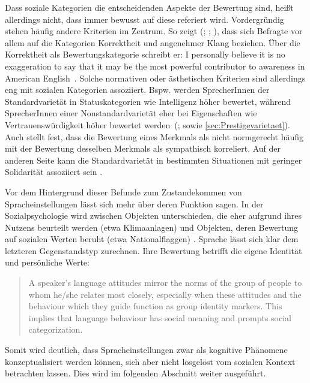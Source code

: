Dass soziale Kategorien die entscheidenden Aspekte der Bewertung sind, heißt allerdings nicht, dass immer bewusst auf diese referiert wird. 
Vordergründig stehen häufig andere Kriterien im Zentrum. 
So zeigt \citeauthor{Preston2004} (\citeyear{Preston1996}; \citeyear{Preston2004}; \citeyear{Preston2005}), dass sich Befragte vor allem auf die Kategorien Korrektheit und angenehmer Klang beziehen. 
Über die Korrektheit als Bewertungskategorie schreibt er: {\glqq}I personally believe it is no exaggeration to say that it may be the most powerful contributor to awareness in American English{\grqq}~\citep[54]{Preston1996}. 
Solche normativen oder ästhetischen Kriterien sind allerdings eng mit sozialen Kategorien assoziiert. 
Bspw. werden SprecherInnen der Standardvariet{\"a}t in Statuskategorien wie Intelligenz h{\"o}her bewertet, w{\"a}hrend SprecherInnen einer Nonstandardvariet{\"a}t eher bei Eigenschaften wie Vertrauensw{\"u}rdigkeit h{\"o}her bewertet werden~(\citealp[s.][155]{Creber.1983}; sowie \autoref{sec:Prestigevarietaet}). 
Auch \citet[732]{Neuland.1993} stellt fest, dass die Bewertung eines Merkmals als nicht normgerecht h{\"a}ufig mit der Bewertung desselben Merkmals als sympathisch korreliert. 
Auf der anderen Seite kann die Standardvarietät in bestimmten Situationen mit geringer Solidarität assoziiert sein \citep[s.][586--587]{Giles.1988}.

Vor dem Hintergrund dieser Befunde zum Zustandekommen von Spracheinstellungen lässt sich mehr über deren Funktion sagen. 
In der Sozialpsychologie wird zwischen Objekten unterschieden, die eher aufgrund ihres Nutzens beurteilt werden (etwa Klimaanlagen) und Objekten, deren Bewertung auf sozialen Werten beruht (etwa Nationalflaggen) \citep[s.][210]{Jonas.2014}. 
Sprache lässt sich klar dem letzteren Gegenstandstyp zurechnen. 
Ihre Bewertung betrifft die eigene Identität und persönliche Werte: 
\begin{quote} A speaker's language attitudes mirror the norms of the group of people to whom he/she relates most closely, especially when these attitudes and the behaviour which they guide function as group identity markers. This implies that language behaviour has social meaning and prompts social categorization. \citep[1321]{Vandermeeren2005} \end{quote} 
Somit wird deutlich, dass Spracheinstellungen zwar als kognitive Phänomene konzeptualisiert werden können, sich aber nicht losgelöst vom sozialen Kontext betrachten lassen. 
Dies wird im folgenden Abschnitt weiter ausgeführt. 
